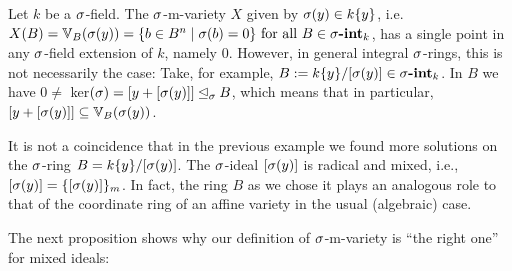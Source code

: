\begin{ex}
Let $k$ be a $\sigma$-field. The $\sigma$-m-variety $X$ given by $\sigma(y) \in k\{y\}$, i.e. $X(B) = \mathbb{V}_B(\sigma(y)) = \{ b \in B^n \mid \sigma(b) = 0 \} \text{ for all } B \in \sigma\text{{\normalfont\textbf{-int}}}_k$, has a single point in any $\sigma$-field extension of $k$, namely $0$. However, in general integral $\sigma$-rings,
this is not necessarily the case: Take, for example, $B:= k\{y\}/[\sigma(y)] \in \sigma\text{{\normalfont\textbf{-int}}}_k$. In $B$ we have $0 \neq $ ker$(\sigma) = [y+ [\sigma(y)]] \unlhd_{\sigma} B$, which means that in particular, $[y + [\sigma(y)]] \subseteq \mathbb{V}_B(\sigma(y))$.
\end{ex}

It is not a coincidence that in the previous example we found more solutions on the $\sigma$-ring $B = k\{y\}/[\sigma(y)]$. The $\sigma$-ideal $[\sigma(y)]$ is radical and mixed, i.e., $[\sigma(y)] = \{ [\sigma(y)] \}_m$.
In fact, the ring $B$ as we chose it plays an analogous role to that of the coordinate ring of an affine variety in the usual (algebraic) case.

The next proposition shows why our definition of $\sigma$-m-variety is ``the right one'' for mixed ideals:

